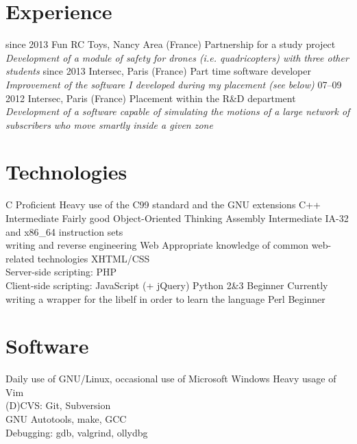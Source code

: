 \documentclass[]{friggeri-cv}
\begin{document}
\section{Experience}

\begin{entrylist}
  \entry
    {since 2013}
    {Fun RC Toys, Nancy Area (France)}
    {Partnership for a study project}
    {\emph{Development of a module of safety for drones (i.e. quadricopters) with three other students}}
  \entry
    {since 2013}
    {Intersec, Paris (France)}
    {Part time software developer}
    {\emph{Improvement of the software I developed during my placement (see below)}}
  \entry
    {07–09 2012}
    {Intersec, Paris (France)}
    {Placement within the R\&D department}
    {\emph{Development of a software capable of simulating the motions of a large network of subscribers who move smartly inside a given zone}}
\end{entrylist}

\section{Technologies}
\begin{entrylist}
  \entry
    {C}
    {Proficient}
    {}
    {Heavy use of the C99 standard and the GNU extensions}
  \entry
    {C++}
    {Intermediate}
    {}
    {Fairly good Object-Oriented Thinking}
  \entry
    {Assembly}
    {Intermediate}
    {}
    {IA-32 and x86\_64 instruction sets\\
    writing and reverse engineering}
  \entry
    {Web}
    {Appropriate knowledge of common web-related technologies}
    {}
    {XHTML/CSS\\
        Server-side scripting: PHP\\
        Client-side scripting: JavaScript (+ jQuery)
    }
  \entry
    {Python 2\&3}
    {Beginner}
    {}
    {Currently writing a wrapper for the libelf in order to learn the language}
  \entry
    {Perl}
    {Beginner}
    {}
    {}
\end{entrylist}
\section{Software}
\begin{entrylist}
  \entry
    {}
    {Daily use of GNU/Linux, occasional use of Microsoft Windows}
    {}
    {Heavy usage of Vim\\
    (D)CVS: Git, Subversion\\
    GNU Autotools, make, GCC\\
    Debugging: gdb, valgrind, ollydbg}

\end{entrylist}
\end{document}
